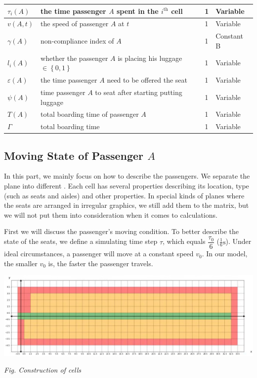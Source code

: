 \documentclass{article}
\newcommand{\cB}{\color{allandarkblue}Constant B\color{black}}
\newcommand{\varr}{\color{allanpurple}Variable\color{black}}
\theoremstyle{definition}
\theoremstyle{remark}
\numberwithin{equation}{section}
\begin{document}
\begin{center}
\begin{tabular}{|l|l|l|l|}
		$\tau _i\left( A \right)$&the time passenger $A$ spent in the $i^\text{th}$ cell&1&\varr\\
		\hline
		$v\left( A,t \right)$&the speed of passenger $A$ at $t$&1&\varr\\
		\hline
		$\gamma \left( A \right)$&non-compliance index of \(A\)&1&\cB\\
		\hline
		$l_i\left( A \right)$&whether the passenger $A$ is placing his luggage \(\in\left\{0,1\right\}\)&1&\varr\\
		\hline
		$\varepsilon \left( A \right)$&the time passenger $A$ need to be offered the seat&1&\varr\\
		\hline
		$\psi \left( A \right)$&time passenger $A$ to seat after starting putting luggage&1&\varr\\
		\hline
		$T\left( A \right)$&total boarding time of passenger $A$&1&\varr\\
		\hline
		$\Gamma$ &total boarding time&1&\varr\\
		\hline
	\end{tabular}
	\end{center}
	\subsection{Moving State of Passenger $A$}
	In this part, we mainly focus on how to describe the passengers. We separate the plane into different . Each cell has several properties describing its location, type (such as seats and aisles) and other properties. In special kinds of planes where the seats are arranged in irregular graphics, we still add them to the matrix, but we will not put them into consideration when it comes to calculations.

	First we will discuss the passenger's moving condition. To better describe the state of the seats, we define a simulating time step $\tau$, which equals $\dfrac{\tau_0}{6}$ ($\frac{1}{6}\mathrm{s}$). Under ideal circumstances, a passenger will move at a constant speed $v_0$. In our model, the smaller $v_0$ is, the faster the passenger travels.

	\begin{center}
		\includegraphics[width = 14cm]{cell_visualization.jpg}

		\small\textit{Fig. Construction of cells}
	\end{center}
\end{document}
